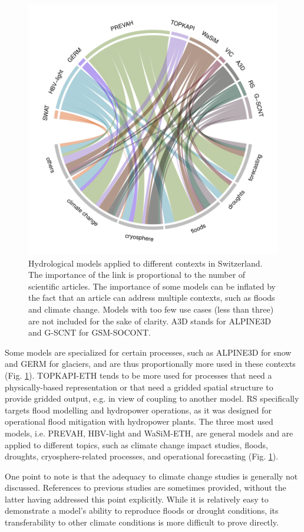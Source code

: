 \documentclass[10pt,a4paper]{article}
\begin{document}
\begin{figure}[htb]
	\begin{center}
		\includegraphics[width=0.70\columnwidth]{figures/chord_diagram}
		\caption{{Hydrological models applied to different contexts in Switzerland. The
				importance of the link is proportional to the number of scientific
				articles. The importance of some models can be inflated by the fact that
				an article can address multiple contexts, such as floods and climate
				change. Models with too few use cases (less than three) are not included
				for the sake of clarity. A3D stands for ALPINE3D and G-SCNT for
				GSM-SOCONT.
				{\label{fig:applications}}
		}}
	\end{center}
\end{figure}

Some models are specialized for certain processes, such as ALPINE3D for
snow and GERM for glaciers, and are thus proportionally more used in
these contexts (Fig. \ref{fig:applications}). TOPKAPI-ETH tends
to be more used for processes that need a physically-based
representation or that need a gridded spatial structure to provide
gridded output, e.g. in view of coupling to another model. RS
specifically targets flood modelling and hydropower operations, as it
was designed for operational flood mitigation with hydropower plants.
The three most used models, i.e. PREVAH, HBV-light and WaSiM-ETH, are
general models and are applied to different topics, such as climate
change impact studies, floods, droughts, cryosphere-related processes,
and operational forecasting (Fig. \ref{fig:applications}).

One point to note is that the adequacy to climate change studies is
generally not discussed. References to previous studies are sometimes
provided, without the latter having addressed this point explicitly.
While it is relatively easy to demonstrate a model's ability to
reproduce floods or drought conditions, its transferability to other
climate conditions is more difficult to prove directly.
\end{document}
